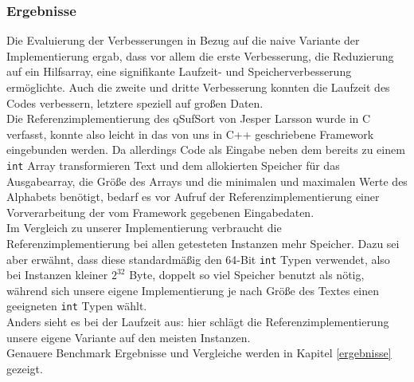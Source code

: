 \subsubsection{Ergebnisse}
Die Evaluierung der Verbesserungen in Bezug auf die naive Variante der Implementierung ergab, dass vor allem die erste Verbesserung, die Reduzierung auf ein Hilfsarray, eine signifikante Laufzeit- und Speicherverbesserung ermöglichte.
Auch die zweite und dritte Verbesserung konnten die Laufzeit des Codes verbessern, letztere speziell auf großen Daten.\\
Die Referenzimplementierung des qSufSort von Jesper Larsson wurde in C verfasst, konnte also leicht in das von uns in C++ geschriebene Framework eingebunden werden. Da allerdings Code als Eingabe neben dem bereits zu einem \texttt{int} Array transformieren Text und dem allokierten Speicher für das Ausgabearray, die Größe des Arrays und die minimalen und maximalen Werte des Alphabets benötigt, bedarf es vor Aufruf der Referenzimplementierung einer Vorverarbeitung der vom Framework gegebenen Eingabedaten. \\
Im Vergleich zu unserer Implementierung verbraucht die Referenzimplementierung bei allen getesteten Instanzen mehr Speicher. Dazu sei aber erwähnt, dass diese standardmäßig den 64-Bit \texttt{int} Typen verwendet, also bei Instanzen kleiner $2^{32}$ Byte, doppelt so viel Speicher benutzt als nötig, während sich unsere eigene Implementierung je nach Größe des Textes einen geeigneten \texttt{int} Typen wählt. \\
Anders sieht es bei der Laufzeit aus: hier schlägt die Referenzimplementierung unsere eigene Variante auf den meisten Instanzen. \\
Genauere Benchmark Ergebnisse und Vergleiche werden in Kapitel \ref{ergebnisse} gezeigt.